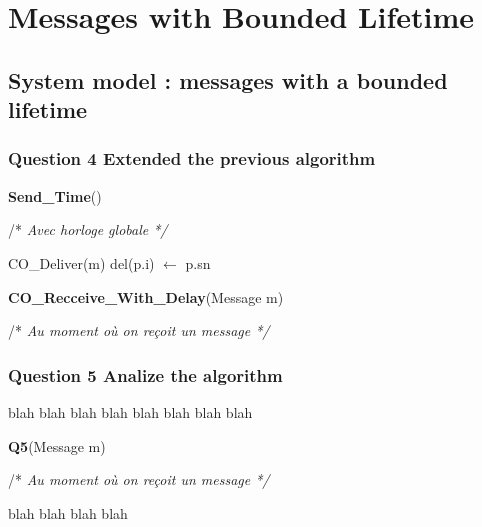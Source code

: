 \chapter{Messages with Bounded Lifetime}

\section{System model : messages with a bounded lifetime}

\subsection{Question 4 Extended the previous algorithm}
\begin{algorithm}
\caption{\textbf{Send\_Time}()}
/* \textit{ Avec horloge globale */}
\label{algo:Q4a}
\begin{algorithmic}[1]
      \STATE  CO\_Deliver(m)
   del(p.i) $\leftarrow$ p.sn
   \ENDIF
   \ENDFOR
  \ENDIF
\end{algorithmic}
\end{algorithm}


\begin{algorithm}
\caption{\textbf{CO\_Recceive\_With\_Delay}(Message m)}
/* \textit{ Au moment où on reçoit un message */}
\label{algo:Q4b}
\begin{algorithmic}[1]
  \STATE Delete(m)
   \STATE  del(e.i) $\leftarrow$ e.sn
     \STATE  cb +=\{e.sn, e.i\}
     \STATE  CO\_Deliver(m)
     CO\_Receive2(m\'~})
       \ENDFOR
       \ELSE
       \STATE ListMessages.add(m)
       \ENDIF
\end{algorithmic}
\end{algorithm}


\subsection{Question 5 Analize the algorithm}
 blah  blah  blah  blah  blah  blah  blah  blah 

\begin{algorithm}
\caption{\textbf{Q5}(Message m)}
/* \textit{ Au moment où on reçoit un message */}
\label{algo:Q5}
\begin{algorithmic}[1]
\end{algorithmic}
\end{algorithm}



 blah  blah  blah  blah 
